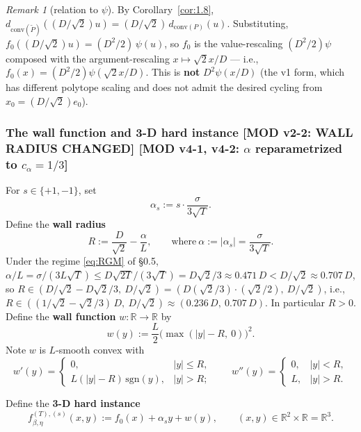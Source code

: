 \documentclass[11pt,a4paper]{article}
\theoremstyle{plain}
\theoremstyle{definition}
\theoremstyle{remark}
\newtheorem{remark}[theorem]{Remark}
\newcommand{\R}{\mathbb{R}}
\newcommand{\conv}{\mathrm{conv}}
\begin{document}
\begin{remark}[relation to $\psi$]
By Corollary~\ref{cor:1.8}, $d_{\conv(\widetilde P)}((D/\sqrt 2) u) = (D/\sqrt 2)\, d_{\conv(P)}(u)$. Substituting, $f_0((D/\sqrt 2) u) = (D^2/2)\, \psi(u)$, so $f_0$ is the value-rescaling $(D^2/2)\psi$ composed with the argument-rescaling $x \mapsto \sqrt 2 x / D$ --- i.e., $f_0(x) = (D^2/2)\psi(\sqrt 2 x/D)$. This is \textbf{not} $D^2\psi(x/D)$ (the v1 form, which has different polytope scaling and does not admit the desired cycling from $x_0 = (D/\sqrt 2) e_0$).
\end{remark}

\subsubsection{The wall function and 3-D hard instance \textbf{[MOD v2-2: WALL RADIUS CHANGED] [MOD v4-1, v4-2: $\alpha$ reparametrized to $c_\alpha = 1/3$]}}

For $s \in \{+1, -1\}$, set
\begin{equation}
\alpha_s := s \cdot \frac{\sigma}{3\sqrt T}.\tag{ALPHA}\label{eq:ALPHA}
\end{equation}
Define the \textbf{wall radius}
\begin{equation}
R := \frac{D}{\sqrt 2} - \frac{\alpha}{L}, \qquad \text{where}\ \alpha := |\alpha_s| = \frac{\sigma}{3\sqrt T}.\tag{R-def}\label{eq:R-def}
\end{equation}
Under the regime \eqref{eq:RGM} of \S0.5, $\alpha/L = \sigma/(3L\sqrt T) \leq D\sqrt{2T}/(3\sqrt T) = D\sqrt 2/3 \approx 0.471\,D < D/\sqrt 2 \approx 0.707\,D$, so $R \in (D/\sqrt 2 - D\sqrt 2/3,\ D/\sqrt 2) = (D(\sqrt 2/3)\cdot(\sqrt 2/2),\ D/\sqrt 2)$, i.e., $R \in ((1/\sqrt 2 - \sqrt 2/3)\,D,\ D/\sqrt 2) \approx (0.236\,D,\ 0.707\,D)$. In particular $R > 0$. Define the \textbf{wall function} $w : \R \to \R$ by
\[
w(y) := \frac{L}{2}\big(\max(|y| - R,\ 0)\big)^2.
\]
Note $w$ is $L$-smooth convex with
\[
w'(y) = \begin{cases}0, & |y| \leq R, \\ L(|y| - R)\,\mathrm{sgn}(y), & |y| > R;\end{cases}\qquad w''(y) = \begin{cases}0, & |y| < R, \\ L, & |y| > R.\end{cases}
\]

Define the \textbf{3-D hard instance}
\begin{equation}
f_{\beta,\eta}^{(T),(s)}(x, y) := f_0(x) + \alpha_s y + w(y),\qquad (x, y) \in \R^2 \times \R = \R^3.\tag{F}\label{eq:F}
\end{equation}
\end{document}

